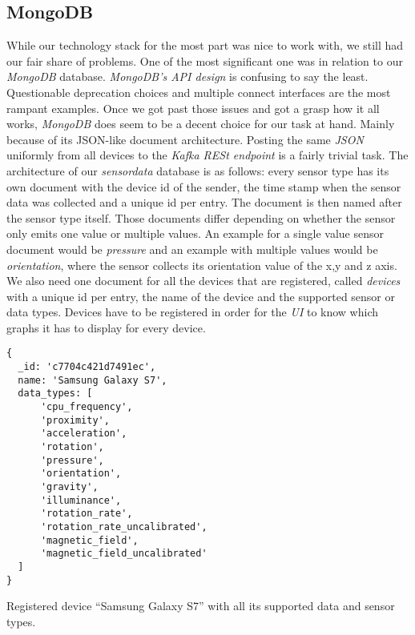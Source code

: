 \subsection{MongoDB}

While our technology stack for the most part was nice to work with, we still had our fair share of
problems. One of the most significant one was in relation to our \textit{MongoDB} database.
\textit{MongoDB’s API design} is confusing to say the least. Questionable deprecation choices and
multiple connect interfaces are the most rampant examples. Once we got past those issues and got a
grasp how it all works, \textit{MongoDB} does seem to be a decent choice for our task at hand.
Mainly because of its JSON-like document architecture. Posting the same \textit{JSON} uniformly from
all devices to the \textit{Kafka RESt endpoint} is a fairly trivial task. The architecture of our
\textit{sensordata} database is as follows: every sensor type has its own document with the device
id of the sender, the time stamp when the sensor data was collected and a unique id per entry. The
document is then named after the sensor type itself. Those documents differ depending on whether the
sensor only emits one value or multiple values. An example for a single value sensor document would
be \textit{pressure} and an example with multiple values would be \textit{orientation}, where the
sensor collects its orientation value of the x,y and z axis. We also need one document for all the
devices that are registered, called \textit{devices} with a unique id per entry, the name of the
device and the supported sensor or data types. Devices have to be registered in order for the
\textit{UI} to know which graphs it has to display for every device.

\begin{code}[H]
  \centering
  \begin{lstlisting}[basicstyle=\small\ttfamily]
{
  _id: 'c7704c421d7491ec',
  name: 'Samsung Galaxy S7',
  data_types: [
      'cpu_frequency',
      'proximity',
      'acceleration',
      'rotation',
      'pressure',
      'orientation',
      'gravity',
      'illuminance',
      'rotation_rate',
      'rotation_rate_uncalibrated',
      'magnetic_field',
      'magnetic_field_uncalibrated'
  ]
}
  \end{lstlisting}
  \caption{Registered device “Samsung Galaxy S7” with all its supported data and sensor types.}
\end{code}
